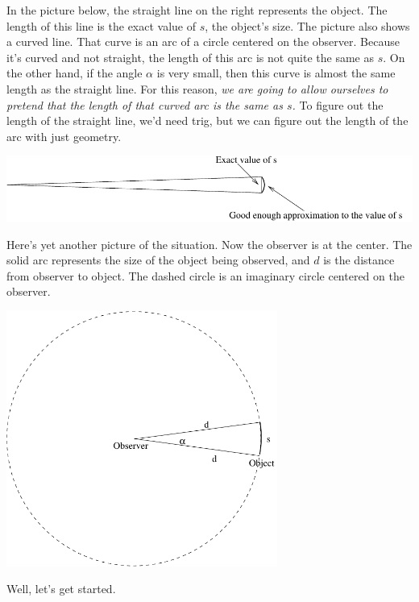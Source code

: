 In the picture below, the straight line on the right
represents the
object.  The length of this line is the exact value of $s$, the object's
size.  The picture also shows a curved line.  That curve is an arc
of a circle centered on the observer.  Because it's curved and not straight,
the length of this arc is not quite the same as $s$.  On the other hand,
if the angle $\alpha$ is very small, then this curve is almost the same
length as the straight line.  For this reason, {\it we are going to allow
ourselves to pretend that the length of that curved arc is the
same as $s$.}  To figure out the length of the straight line, we'd
need trig, but we can figure out the length of the arc with just
geometry.


\medskip
\centerline{\includegraphics[width=6in]{angularsize/angularsizefig2.pdf}}
\medskip

\pagebreak[4]
Here's yet another picture of the situation.  Now the observer is at
the center.  The solid arc represents the size of the object being observed,
and $d$ is the distance from observer to object.  The dashed circle
is an imaginary circle centered on the observer.

\medskip
\centerline{\includegraphics[width=3.5in]{angularsize/angularsizefig3.pdf}}
\medskip

Well, let's get started.



